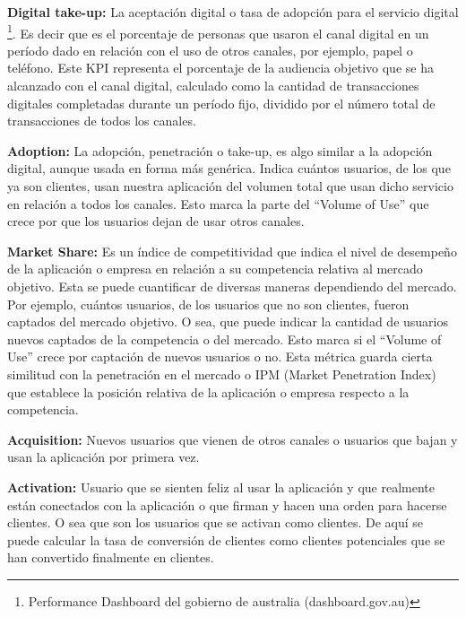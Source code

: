 \begin{description}
  \item {\textbf{Digital take-up:} La aceptación digital o tasa de adopción para el servicio digital \footnote{Performance Dashboard del gobierno de australia (dashboard.gov.au)}. Es decir que es el porcentaje de personas que usaron el canal digital en un período dado en relación con el uso de otros canales, por ejemplo, papel o teléfono. Este KPI representa el porcentaje de la audiencia objetivo que se ha alcanzado con el canal digital, calculado como la cantidad de transacciones digitales completadas durante un período fijo, dividido por el número total de transacciones de todos los canales.
}

  \item {\textbf{Adoption:} La adopción, penetración o take-up, es algo similar a la adopción digital, aunque usada en forma más genérica. Indica cuántos usuarios, de los que ya son clientes, usan nuestra aplicación del volumen total que usan dicho servicio en relación a todos los canales. Esto marca la parte del “Volume of Use” que crece por que los usuarios dejan de usar otros canales.
}

  \item {\textbf{Market Share:} Es un índice de competitividad que indica el nivel de desempeño de la aplicación o empresa en relación a su competencia relativa al mercado objetivo. Esta se puede cuantificar de diversas maneras dependiendo del mercado. Por ejemplo, cuántos usuarios, de los usuarios que no son clientes, fueron captados del mercado objetivo. O sea, que puede indicar la cantidad de usuarios nuevos captados de la competencia o del mercado. Esto marca si el “Volume of Use” crece por captación de nuevos usuarios o no. Esta métrica guarda cierta similitud con la penetración en el mercado o IPM (Market Penetration Index) que establece la posición relativa de la aplicación o empresa respecto a la competencia.
}

  \item {\textbf{Acquisition:} Nuevos usuarios que vienen de otros canales o usuarios que bajan y usan la aplicación por primera vez.
}

  \item {\textbf{Activation:} Usuario que se sienten feliz al usar la aplicación y que realmente están conectados con la aplicación o que firman y hacen una orden para hacerse clientes. O sea que son los usuarios que se activan como clientes. De aquí se puede calcular la tasa de conversión de clientes como clientes potenciales que se han convertido finalmente en clientes.
}


\end{description}
